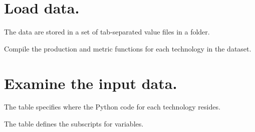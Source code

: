\documentclass[letterpaper,10pt,english]{sphinxmanual}
\begin{document}
\section{Load data.}
\label{\detokenize{ioc-1:load-data}}
The data are stored in a set of tab-separated value files in a folder.

\begin{sphinxVerbatim}[commandchars=\\\{\}]
  
\end{sphinxVerbatim}

\begin{sphinxVerbatim}[commandchars=\\\{\}]
  
\end{sphinxVerbatim}

Compile the production and metric functions for each technology in the dataset.

\begin{sphinxVerbatim}[commandchars=\\\{\}]
\end{sphinxVerbatim}


\section{Examine the input data.}
\label{\detokenize{ioc-1:examine-the-input-data}}
The  table specifies where the Python code for each technology resides.

\begin{sphinxVerbatim}[commandchars=\\\{\}]
\end{sphinxVerbatim}



The  table defines the subscripts for variables.

\begin{sphinxVerbatim}[commandchars=\\\{\}]
   
\end{sphinxVerbatim}
\end{document}
